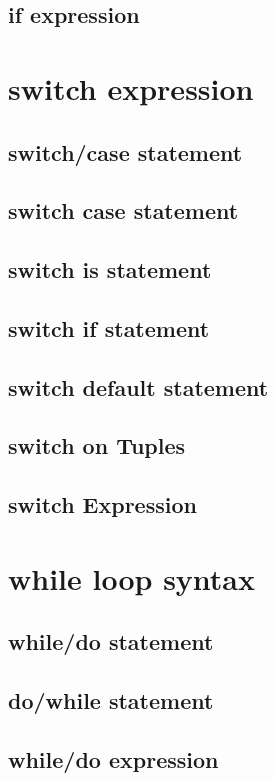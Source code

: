 \documentclass{tufte-book}
\begin{document}
            \subsection{if expression}
            \section{switch expression}

            \subsection{switch/case statement}
            \subsection{switch case statement}
            \subsection{switch is statement}
            \subsection{switch if statement}
            \subsection{switch default statement}
            \subsection{switch on Tuples}
            \subsection{switch Expression}

            \section{while loop syntax}
            \subsection{while/do statement}
            \subsection{do/while statement}
            \subsection{while/do expression}
\end{document}
